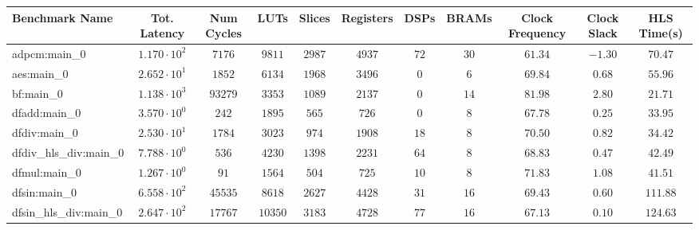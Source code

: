\begin{tabular}{|l|c|c|c|c|c|c|c|c|c|c|}
\hline
Benchmark Name          & Tot. Latency           & Num Cycles & LUTs      & Slices    & Registers & DSPs    & BRAMs   & Clock Frequency & Clock Slack & HLS Time(s) \\
\hline
adpcm:main\_0           & $ 1.170 \cdot 10^{2} $ & $ 7176   $ & $ 9811  $ & $ 2987  $ & $ 4937  $ & $ 72  $ & $ 30  $ & $ 61.34       $ & $ -1.30   $ & $ 70.47   $ \\
aes:main\_0             & $ 2.652 \cdot 10^{1} $ & $ 1852   $ & $ 6134  $ & $ 1968  $ & $ 3496  $ & $ 0   $ & $ 6   $ & $ 69.84       $ & $ 0.68    $ & $ 55.96   $ \\
bf:main\_0              & $ 1.138 \cdot 10^{3} $ & $ 93279  $ & $ 3353  $ & $ 1089  $ & $ 2137  $ & $ 0   $ & $ 14  $ & $ 81.98       $ & $ 2.80    $ & $ 21.71   $ \\
dfadd:main\_0           & $ 3.570 \cdot 10^{0} $ & $ 242    $ & $ 1895  $ & $ 565   $ & $ 726   $ & $ 0   $ & $ 8   $ & $ 67.78       $ & $ 0.25    $ & $ 33.95   $ \\
dfdiv:main\_0           & $ 2.530 \cdot 10^{1} $ & $ 1784   $ & $ 3023  $ & $ 974   $ & $ 1908  $ & $ 18  $ & $ 8   $ & $ 70.50       $ & $ 0.82    $ & $ 34.42   $ \\
dfdiv\_hls\_div:main\_0 & $ 7.788 \cdot 10^{0} $ & $ 536    $ & $ 4230  $ & $ 1398  $ & $ 2231  $ & $ 64  $ & $ 8   $ & $ 68.83       $ & $ 0.47    $ & $ 42.49   $ \\
dfmul:main\_0           & $ 1.267 \cdot 10^{0} $ & $ 91     $ & $ 1564  $ & $ 504   $ & $ 725   $ & $ 10  $ & $ 8   $ & $ 71.83       $ & $ 1.08    $ & $ 41.51   $ \\
dfsin:main\_0           & $ 6.558 \cdot 10^{2} $ & $ 45535  $ & $ 8618  $ & $ 2627  $ & $ 4428  $ & $ 31  $ & $ 16  $ & $ 69.43       $ & $ 0.60    $ & $ 111.88  $ \\
dfsin\_hls\_div:main\_0 & $ 2.647 \cdot 10^{2} $ & $ 17767  $ & $ 10350 $ & $ 3183  $ & $ 4728  $ & $ 77  $ & $ 16  $ & $ 67.13       $ & $ 0.10    $ & $ 124.63  $ \\

\end{tabular}
